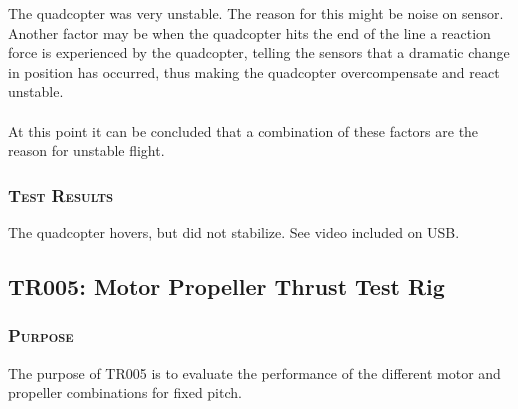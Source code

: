 The quadcopter was very unstable. The reason for this might be noise on sensor. Another factor may be when the quadcopter hits the end of the line a reaction force is experienced by the quadcopter, telling the sensors that a dramatic change in position has occurred, thus making the quadcopter overcompensate and react unstable. 
\\\\
At this point it can be concluded that a combination of these factors are the reason for unstable flight.

\subsubsection*{\textsc{\medium Test Results}}
The quadcopter hovers, but did not stabilize. See video included on USB.
\newpage

\subsection{TR005: Motor Propeller Thrust Test Rig}
         {}

\subsubsection*{\textsc{\medium Purpose}}
The purpose of TR005 is to evaluate the performance of the different motor and propeller combinations for fixed pitch. 


